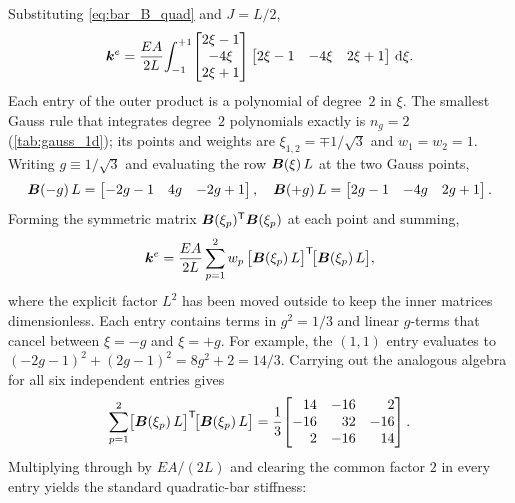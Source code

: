 Substituting \cref{eq:bar_B_quad} and $J = L/2$,
\begin{equation}
    \bm{k}^e
    = \frac{EA}{2L}\!\int_{-1}^{+1}\!
    \begin{bmatrix} 2\xi-1 \\ -4\xi \\ 2\xi+1 \end{bmatrix}
    \begin{bmatrix} 2\xi-1 & -4\xi & 2\xi+1 \end{bmatrix} \,\mathrm{d}\xi .
    \label{eq:bar_ke_integrand_quad}
\end{equation}
Each entry of the outer product is a polynomial of degree~$2$ in $\xi$.
The smallest Gauss rule that integrates degree~$2$ polynomials exactly
is $n_g = 2$ (\cref{tab:gauss_1d}); its points and weights are
$\xi_{1,2} = \mp 1/\sqrt{3}$ and $w_1 = w_2 = 1$. Writing
$g \equiv 1/\sqrt{3}$ and evaluating the row $\bm{B}(\xi)\,L$ at the
two Gauss points,
\begin{equation*}
    \bm{B}(-g)\,L = \begin{bmatrix} -2g-1 & 4g & -2g+1 \end{bmatrix}, \quad
    \bm{B}(+g)\,L = \begin{bmatrix}  2g-1 & -4g &  2g+1 \end{bmatrix}.
\end{equation*}
Forming the symmetric matrix
$\bm{B}(\xi_p)^{\mathsf{T}}\bm{B}(\xi_p)$ at each point and summing,
\begin{equation}
    \bm{k}^e
    = \frac{EA}{2L}\sum_{p=1}^{2} w_p\,
      \bigl[\bm{B}(\xi_p)\,L\bigr]^{\mathsf{T}}\!
      \bigl[\bm{B}(\xi_p)\,L\bigr] ,
\end{equation}
where the explicit factor $L^2$ has been moved outside to keep the inner
matrices dimensionless. Each entry contains terms in $g^2 = 1/3$ and
linear $g$-terms that cancel between $\xi=-g$ and $\xi=+g$. For example,
the $(1,1)$ entry evaluates to $(-2g-1)^2 + (2g-1)^2 = 8g^2 + 2 = 14/3$.
Carrying out the analogous algebra for all six independent entries gives
\begin{equation}
    \sum_{p=1}^{2}
    \bigl[\matr{B}(\xi_p)\,L\bigr]\transpose\!\bigl[\matr{B}(\xi_p)\,L\bigr]
    = \frac{1}{3}\!
    \begin{bmatrix*}[r]
        14 & -16 &   2 \\
       -16 &  32 & -16 \\
         2 & -16 &  14
    \end{bmatrix*}.
\end{equation}
Multiplying through by $EA/(2L)$ and clearing the common factor $2$ in
every entry yields the standard quadratic-bar stiffness:

